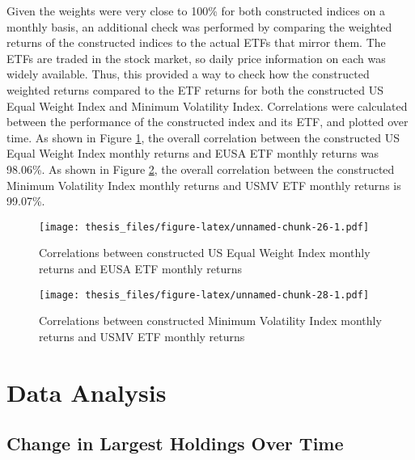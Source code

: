 \documentclass[12pt,twoside]{reedthesis}
\theoremstyle{definition}
\theoremstyle{definition}
\theoremstyle{definition}
\theoremstyle{remark}
\begin{document}
Given the weights were very close to 100\% for both constructed indices
on a monthly basis, an additional check was performed by comparing the
weighted returns of the constructed indices to the actual ETFs that
mirror them. The ETFs are traded in the stock market, so daily price
information on each was widely available. Thus, this provided a way to
check how the constructed weighted returns compared to the ETF returns
for both the constructed US Equal Weight Index and Minimum Volatility
Index. Correlations were calculated between the performance of the
constructed index and its ETF, and plotted over time. As shown in Figure
\ref{fig:plot3}, the overall correlation between the constructed US
Equal Weight Index monthly returns and EUSA ETF monthly returns was
98.06\%. As shown in Figure \ref{fig:plot4}, the overall correlation
between the constructed Minimum Volatility Index monthly returns and
USMV ETF monthly returns is 99.07\%.
\begin{figure}[htbp]
\centering
\texttt{[image: thesis\_files/figure-latex/unnamed-chunk-26-1.pdf]}
\caption{\label{fig:unnamed-chunk-26}Correlations between constructed US
Equal Weight Index monthly returns and EUSA ETF monthly
returns\label{fig:plot3}}
\end{figure}
\begin{figure}[htbp]
\centering
\texttt{[image: thesis\_files/figure-latex/unnamed-chunk-28-1.pdf]}
\caption{\label{fig:unnamed-chunk-28}Correlations between constructed
Minimum Volatility Index monthly returns and USMV ETF monthly
returns\label{fig:plot4}}
\end{figure}
\chapter{Data Analysis}\label{data-analysis}

\section{Change in Largest Holdings Over
Time}\label{change-in-largest-holdings-over-time}
\end{document}

